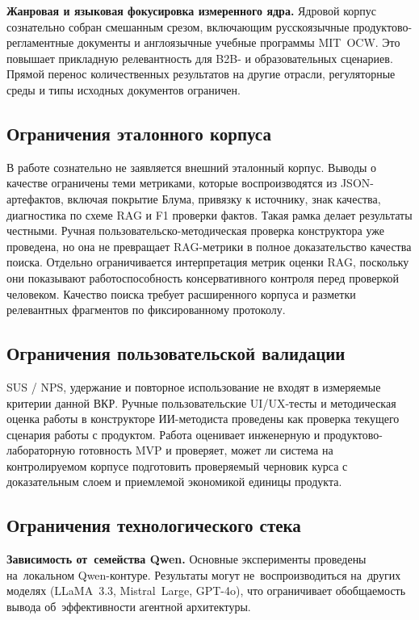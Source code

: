 \textbf{Жанровая и языковая фокусировка измеренного ядра.}
Ядровой корпус сознательно собран смешанным срезом, включающим
русскоязычные продуктово-регламентные документы и англоязычные учебные
программы MIT~OCW. Это повышает прикладную релевантность для
B2B- и образовательных сценариев. Прямой перенос количественных результатов
на другие отрасли, регуляторные среды и типы исходных документов ограничен.

\subsection{Ограничения эталонного корпуса}

В работе сознательно не заявляется внешний эталонный корпус.
Выводы о качестве ограничены теми метриками, которые воспроизводятся
из JSON-артефактов, включая покрытие Блума, привязку к источнику, знак качества,
диагностика по схеме RAG и F1 проверки фактов. Такая рамка делает результаты
честными. Ручная пользовательско-методическая проверка конструктора уже
проведена, но она не превращает RAG-метрики в полное доказательство качества
поиска.
Отдельно ограничивается интерпретация метрик оценки RAG, поскольку они показывают
работоспособность консервативного контроля перед проверкой человеком.
Качество поиска требует расширенного корпуса и разметки релевантных
фрагментов по фиксированному протоколу.

\subsection{Ограничения пользовательской валидации}

SUS / NPS, удержание и повторное использование не входят в измеряемые
критерии данной ВКР. Ручные пользовательские UI/UX-тесты и методическая
оценка работы в конструкторе ИИ-методиста проведены как проверка текущего
сценария работы с продуктом. Работа оценивает инженерную и
продуктово-лабораторную готовность MVP и проверяет, может ли система на контролируемом
корпусе подготовить проверяемый черновик курса с доказательным слоем и
приемлемой экономикой единицы продукта.

\subsection{Ограничения технологического стека}

\textbf{Зависимость от~семейства Qwen.}
Основные эксперименты проведены на~локальном Qwen-контуре.
Результаты могут не~воспроизводиться на~других моделях
(LLaMA~3.3, Mistral~Large, GPT-4o), что ограничивает
обобщаемость вывода об~эффективности агентной архитектуры.

